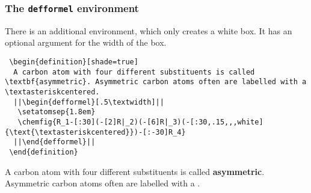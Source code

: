\documentclass[DIV10]{scrartcl}
\begin{document}
\subsubsection{The \texttt{defformel} environment}
There is an additional environment, which only creates a white box. It has an optional argument for the width of the box.
\begin{lstlisting}
 \begin{definition}[shade=true]
  A carbon atom with four different substituents is called \textbf{asymmetric}. Asymmetric carbon atoms often are labelled with a \textasteriskcentered.
  ||\begin{defformel}[.5\textwidth]||
   \setatomsep{1.8em}
   \chemfig{R_1-[:30](-[2]R|_2)(-[6]R|_3)(-[:30,.15,,,white]{\text{\textasteriskcentered}})-[:-30]R_4}
  ||\end{defformel}||
 \end{definition}
\end{lstlisting}

\begin{definition}[shade=true]
  A carbon atom with four different substituents is called \textbf{asymmetric}. Asymmetric carbon atoms often are labelled with a \textasteriskcentered.
  \begin{defformel}[.5\textwidth]
   \setatomsep{1.8em}
  \end{defformel}
 \end{definition}
\end{document}
